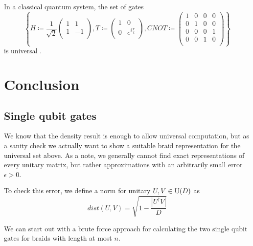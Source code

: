 \documentclass{article}
\begin{document}
\begin{thm}\label{ClassicalGateSet}
  In a classical quantum system, the set of gates 
  \[
     \left\{H \coloneqq \frac{1}{\sqrt{2} }\begin{pmatrix}
      1 &  1 \\
      1 &  -1 \\
    \end{pmatrix}, T \coloneqq  \begin{pmatrix}
      1 &  0 \\
      0 &  e^{i \frac{\pi}{4}} \\
    \end{pmatrix}, CNOT \coloneqq  \begin{pmatrix}
      1 & 0 & 0 &  0 \\
      0 & 1 & 0 &  0 \\
      0 & 0 & 0 &  1 \\
      0 & 0 & 1 &  0 \\
    \end{pmatrix}\right\}
  \]
  is universal \cite{brylinski_universal_2001}.
\end{thm}

\section{Conclusion}
\label{Conclusion}
\subsection{Single qubit gates}
We know that the density result is enough to allow universal computation, but as a sanity check we actually want to show a suitable braid representation for the universal set above. As a note, we generally cannot find exact representations of every unitary matrix, but rather approximations with an arbitrarily small error $\epsilon > 0$.

To check this error, we define a norm for unitary $U,V \in \mathrm{U}(D)$ as
\begin{equation}
  dist(U,V) = \sqrt{1 - \frac{\left\vert U^{\dagger} V \right\vert }{D}} \label{eq:norm}
\end{equation}

We can start out with a brute force approach for calculating the two single qubit gates for braids with length at most $n$. 
\end{document}
